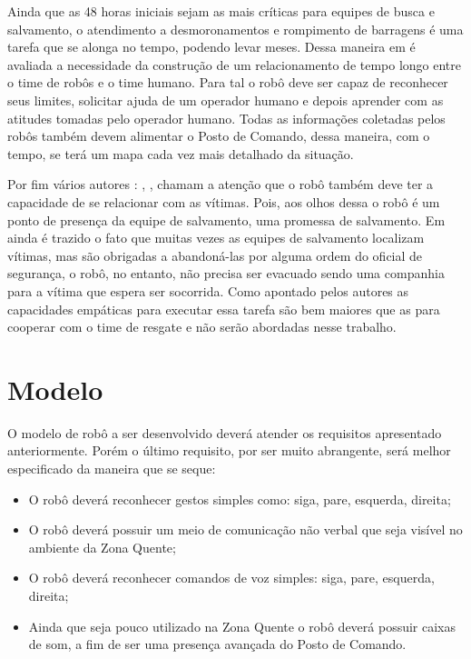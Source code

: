 \documentclass[
	article,			%
	11pt,				%
	oneside,			%
	a4paper,			%
	english,			%
	brazil,				%
	sumario=tradicional	
	]{abntex2}
\begin{document}
Ainda que as 48 horas iniciais sejam as mais críticas para equipes de busca e salvamento, o atendimento a desmoronamentos e rompimento de barragens é uma tarefa que se alonga no tempo, podendo levar meses. Dessa maneira em \cite{krui2015} é avaliada a necessidade da construção de um relacionamento de tempo longo entre o time de robôs e o time humano. Para tal o robô deve ser capaz de reconhecer seus limites, solicitar ajuda de um operador humano e depois aprender com as atitudes tomadas pelo operador humano. Todas as informações coletadas pelos robôs também devem alimentar o Posto de Comando, dessa maneira, com o tempo, se terá um mapa cada vez mais detalhado da situação.

Por fim vários autores : \cite{Robin2004}, \cite{akgun2022using}, \cite{habib2011} chamam a atenção que o robô também deve ter a capacidade de se relacionar com as vítimas. Pois, aos olhos dessa o robô é um ponto de presença da equipe de salvamento, uma promessa de salvamento. Em \cite{Robin2004} ainda é trazido o fato que muitas vezes as equipes de salvamento localizam vítimas, mas são obrigadas a abandoná-las por alguma ordem do oficial de segurança, o robô, no entanto, não precisa ser evacuado sendo uma companhia para a vítima que espera ser socorrida. Como apontado pelos autores as capacidades empáticas para executar essa tarefa são bem maiores que as para cooperar com o time de resgate e não serão abordadas nesse trabalho.

\section{Modelo}
O modelo de robô a ser desenvolvido deverá atender os requisitos apresentado anteriormente. Porém o último requisito, por ser muito abrangente, será melhor especificado da maneira que se seque:

\begin{itemize}
\item O robô deverá reconhecer gestos simples como: siga, pare, esquerda, direita;
\item O robô deverá possuir um meio de comunicação não verbal que seja visível no ambiente da Zona Quente;
\item O robô deverá reconhecer comandos de voz simples: siga, pare, esquerda, direita;
\item Ainda que seja pouco utilizado na Zona Quente o robô deverá possuir caixas de som, a fim de ser uma presença avançada do Posto de Comando.
\end{itemize}
\end{document}
